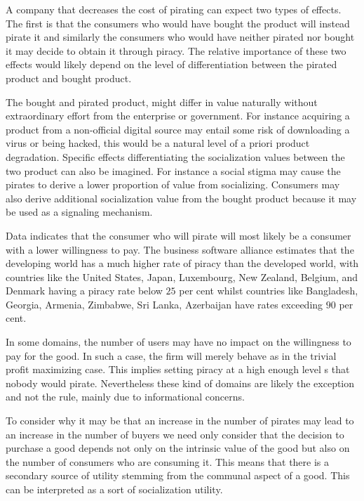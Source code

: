 \documentclass{article}
\begin{document}
A company that decreases the cost of pirating can expect two types of effects. The first is that the consumers who would have bought the product will instead pirate it and similarly the consumers who would have neither pirated nor bought it may decide to obtain it through piracy. The relative importance of these two effects would likely depend on the level of differentiation between the pirated product and bought product.

The bought and pirated product, might differ in value naturally without extraordinary effort from the enterprise or government. For instance acquiring a product from a non-official digital source may entail some risk of downloading a virus or being hacked, this would be a natural level of a priori product degradation. Specific effects differentiating the socialization values between the two product can also be imagined. For instance a social stigma may cause the pirates to derive a lower proportion of value from socializing. Consumers may also derive additional socialization value from the bought product because it may be used as a signaling mechanism.

Data indicates that the consumer who will pirate will most likely be a consumer with a lower willingness to pay. The business software alliance estimates that the developing world has a much higher rate of piracy than the developed world, with countries like the United States, Japan, Luxembourg, New Zealand, Belgium, and Denmark  having a piracy rate below $25$ per cent whilst countries like Bangladesh, Georgia, Armenia, Zimbabwe, Sri Lanka, Azerbaijan have rates exceeding $90$ per cent. \citep{BSA09}

In some domains, the number of users may have no impact on the willingness to pay for the good. In such a case, the firm will merely behave as in the trivial profit maximizing case. This implies setting piracy at a high enough level s that nobody would pirate. Nevertheless these kind of domains are likely the exception and not the rule, mainly due to informational concerns. 

To consider why it may be that an increase in the number of pirates may lead to an increase in the number of buyers we need only consider that the decision to purchase a good depends not only on the intrinsic value of the good but also on the number of consumers who are consuming it. This means that there is a secondary source of utility stemming from the communal aspect of a good. This can be interpreted as a sort of socialization utility.
\end{document}
